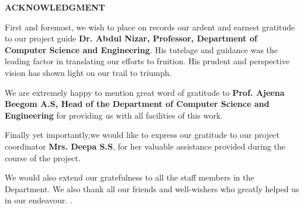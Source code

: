 \documentclass[12pt]{report}
\begin{document}
\newpage
\thispagestyle{empty}
\begin{center}
\textsc{\bf ACKNOWLEDGMENT}
\end{center}
\vspace{20mm}
\begin{spacing}{1.5}
First and foremost, we wish to place on records our ardent and earnest gratitude to our project guide {\bf Dr. Abdul Nizar, Professor, Department of Computer Science and Engineering}. His tutelage and guidance was the leading factor in translating our efforts to fruition. His prudent and perspective vision has shown light on our trail to triumph.

We are extremely happy to mention great word of gratitude to {\bf Prof. Ajeena Beegom A.S, Head of the Department of Computer Science and Engineering} for providing us with all facilities of this work.

Finally yet importantly,we would like to express our gratitude to our project coordinator {\bf Mrs. Deepa S.S}, for her valuable assistance provided during the course of the project.

We would also extend our gratefulness to all the staff members in the Department. We also thank all our friends and well-wishers who greatly helped us in our endeavour.
.\\
\end{spacing}
\vspace{15mm}
{}

\newpage
{
\pagestyle{empty}
\tableofcontents
\listoffigures
\listoftables
\cleardoublepage
}

\pagestyle{fancy}








\end{document}
